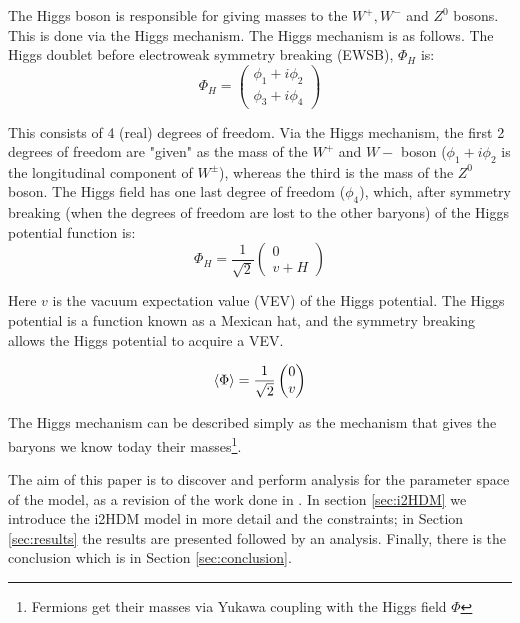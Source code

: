 \documentclass[12pt]{article}
\begin{document}
The Higgs boson is responsible for giving masses to the $W^+, W^-$ and $Z^0$ bosons. This is done via the Higgs mechanism. The Higgs mechanism is as follows.
The Higgs doublet before electroweak symmetry breaking (EWSB), $\Phi_H$ is:
\begin{equation}
    \Phi_H =
    \begin{pmatrix}
        {\phi_1 + i\phi_2} \\
        {\phi_3 + i\phi_4}
    \end{pmatrix}
\end{equation}

This consists of 4 (real) degrees of freedom. Via the Higgs mechanism, the first 2 degrees of freedom are "given" as the mass of the $W^+$ and $W-$ boson ($\phi_1 + i\phi_2$ is the longitudinal component of $W^\pm$), whereas the third is the mass of the $Z^0$ boson. The Higgs field has one last degree of freedom ($\phi_4$), which, after symmetry breaking (when the degrees of freedom are lost to the other baryons) of the Higgs potential function is: 
\begin{equation}
    \Phi_H = \frac{1}{\sqrt{2}}
    \begin{pmatrix}
        {0} \\
        {v + H}
    \end{pmatrix}
\end{equation}

Here $v$ is the vacuum expectation value (VEV) of the Higgs potential. The Higgs potential is a function known as a Mexican hat, and the symmetry breaking allows the Higgs potential to acquire a VEV.

\begin{equation}
    \braket{\Phi} = \frac{1}{\sqrt{2}}
    \begin{pmatrix}
        0\\
        v
    \end{pmatrix}
\end{equation}

The Higgs mechanism can be described simply as the mechanism that gives the baryons we know today their masses\footnote{Fermions get their masses via Yukawa coupling with the Higgs field $\Phi$}.

The aim of this paper is to discover and perform analysis for the parameter space of the model, as a revision of the work done in \cite{Belyaev:2016lok}. In section \ref{sec:i2HDM} we introduce the i2HDM model in more detail and the constraints; in Section \ref{sec:results} the results are presented followed by an analysis. Finally, there is the conclusion which is in Section \ref{sec:conclusion}.
\end{document}
